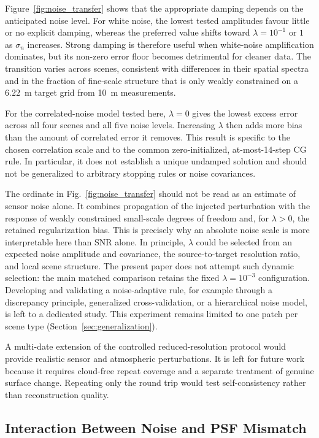\documentclass[journal]{IEEEtran}
\newcommand{\psf}{PSF\xspace}
\begin{document}
Figure~\ref{fig:noise_transfer} shows that the appropriate damping
depends on the anticipated noise level. For white noise, the lowest
tested amplitudes favour little or no explicit damping, whereas the
preferred value shifts toward $\lambda=10^{-1}$ or $1$ as
$\sigma_n$ increases. Strong damping is therefore useful when
white-noise amplification dominates, but its non-zero error floor
becomes detrimental for cleaner data. The transition varies across
scenes, consistent with differences in their spatial spectra and in
the fraction of fine-scale structure that is only weakly constrained
on a $6.22$~m target grid from 10~m measurements.

For the correlated-noise model tested here, $\lambda=0$ gives the
lowest excess error across all four scenes and all five noise
levels. Increasing $\lambda$ then adds more bias than the amount of
correlated error it removes. This result is specific to the chosen
correlation scale and to the common zero-initialized, at-most-14-step
CG rule. In particular, it does not establish a unique undamped
solution and should not be generalized to arbitrary stopping rules
or noise covariances.

The ordinate in Fig.~\ref{fig:noise_transfer} should not be read as
an estimate of sensor noise alone. It combines propagation of the
injected perturbation with the response of weakly constrained
small-scale degrees of freedom and, for $\lambda>0$, the retained
regularization bias. This is precisely why an absolute noise scale
is more interpretable here than SNR alone. In principle, $\lambda$
could be selected from an expected noise amplitude and covariance,
the source-to-target resolution ratio, and local scene structure.
The present paper does not attempt such dynamic selection: the main
matched comparison retains the fixed $\lambda=10^{-3}$ configuration.
Developing and validating a noise-adaptive rule, for example through
a discrepancy principle, generalized cross-validation, or a
hierarchical noise model, is left to a dedicated study. This
experiment remains limited to one patch per scene type
(Section~\ref{sec:generalization}).

A multi-date extension of the controlled reduced-resolution protocol would
provide realistic sensor and atmospheric perturbations. It is left
for future work because it requires cloud-free repeat coverage and a
separate treatment of genuine surface change. Repeating only the
round trip would test self-consistency rather than reconstruction
quality.

\subsection{Interaction Between Noise and \psf Mismatch}
\label{sec:noise_psf_mismatch}
\end{document}
